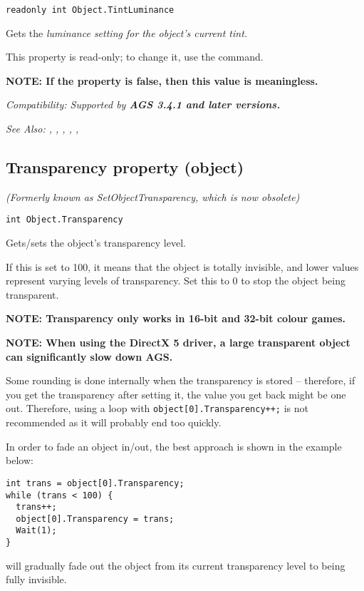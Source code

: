 \begin{verbatim}
readonly int Object.TintLuminance
\end{verbatim}
Gets the \it{luminance} setting for the object's current tint.

This property is read-only; to change it, use the  command.

\bf{NOTE:} If the  property is false, then
this value is meaningless.

\it{Compatibility:} Supported by \bf{AGS 3.4.1} and later versions.

\it{See Also:} , ,
, ,
, 


\subsection{Transparency property (object)}\label{Object.Transparency}%

\it{(Formerly known as SetObjectTransparency, which is now obsolete)}

\begin{verbatim}
int Object.Transparency
\end{verbatim}
Gets/sets the object's transparency level.

If this is set to 100, it means that the object is totally invisible, and lower values
represent varying levels of transparency. Set this to 0 to stop the object being transparent.

\bf{NOTE:} Transparency only works in 16-bit and 32-bit colour games.

\bf{NOTE:} When using the DirectX 5 driver, a large transparent object can significantly slow
down AGS.

Some rounding is done internally when the transparency is stored -- therefore, if you get
the transparency after setting it, the value you get back might be one out. Therefore, using
a loop with \verb$object[0].Transparency++;$ is not recommended as it will probably
end too quickly.

In order to fade an object in/out, the best approach is shown in the example below:

\begin{verbatim}
int trans = object[0].Transparency;
while (trans < 100) {
  trans++;
  object[0].Transparency = trans;
  Wait(1);
}
\end{verbatim}
will gradually fade out the object from its current transparency level to being fully
invisible.

